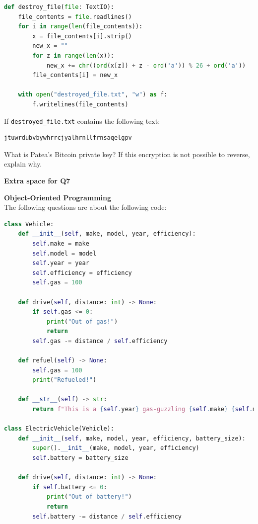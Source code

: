 \documentclass[letterpaper,12pt,addpoints]{exam}
\begin{document}
\begin{questions}
\begin{lstlisting}[language=Python, style=mystyle]
def destroy_file(file: TextIO):
    file_contents = file.readlines()
    for i in range(len(file_contents)):
        x = file_contents[i].strip()
        new_x = ""
        for z in range(len(x)):
            new_x += chr((ord(x[z]) + z - ord('a')) % 26 + ord('a'))
        file_contents[i] = new_x

    with open("destroyed_file.txt", "w") as f:
        f.writelines(file_contents)
    \end{lstlisting}

    If \texttt{destroyed\_file.txt} contains the following text:
    \begin{lstlisting}[language=Python, style=mystyle]
jtuwrdubvbywhrrcjyalhrnllfrnsaqelgpv
    \end{lstlisting}
    What is Patea's Bitcoin private key? If this encryption is not possible to
    reverse, explain why.

    \clearpage

    \begin{center}
        \textbf{Extra space for Q7}\\
    \end{center}
    \clearpage

    \question[10] \textbf{Object-Oriented Programming} \\
    The following questions are about the following code:
    \begin{lstlisting}[language=Python, style=mystyle]
class Vehicle:
    def __init__(self, make, model, year, efficiency):
        self.make = make
        self.model = model
        self.year = year
        self.efficiency = efficiency
        self.gas = 100
    
    def drive(self, distance: int) -> None:
        if self.gas <= 0:
            print("Out of gas!")
            return
        self.gas -= distance / self.efficiency

    def refuel(self) -> None:
        self.gas = 100
        print("Refueled!")
    
    def __str__(self) -> str:
        return f"This is a {self.year} gas-guzzling {self.make} {self.model} with {self.gas}% gas remaining."

class ElectricVehicle(Vehicle):
    def __init__(self, make, model, year, efficiency, battery_size):
        super().__init__(make, model, year, efficiency)
        self.battery = battery_size
    
    def drive(self, distance: int) -> None:
        if self.battery <= 0:
            print("Out of battery!")
            return
        self.battery -= distance / self.efficiency  
    

\end{lstlisting}
\end{questions}
\end{document}
